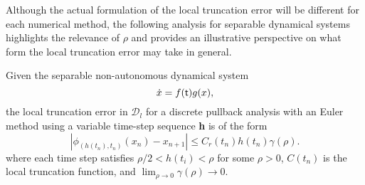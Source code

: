 Although the actual formulation of the local truncation error will be
different for each numerical method, the following analysis for separable
dynamical systems highlights the relevance of $\rho$ and provides an
illustrative perspective on what form the local truncation error may take in
general.

\begin{lemma}\label{lemsdete}
Given the separable non-autonomous dynamical system
\[ \dot{x} = f( \mathsf{\mathsf{t}})g(x), \]
the local truncation error in $\mathcal{D}_l$ for a discrete pullback analysis
with an Euler method using a variable time-step sequence {\bf h}
is of the form
\begin{equation} \label{eqltesde}
  |\phi_{(h(t_n), t_n)}(x_n) - x_{n+1}| \leq C_r(t_n) h(t_n) \gamma(\rho).
\end{equation}
where each time step satisfies $\rho/2 < h(t_i) < \rho$ for some $\rho > 0$,
$C(t_n)$ is the local truncation function, and $\lim_{\rho
\to 0} \gamma(\rho) \to 0$.
\end{lemma}
